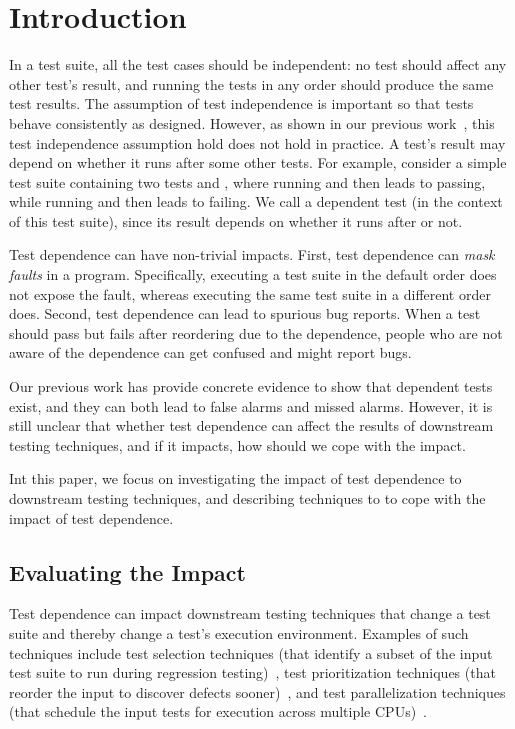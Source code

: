 \section{Introduction}


In a test suite, all the test cases should be independent:
no test should affect any other test's result, and running
the tests in any order should produce the same test results.
The assumption of test independence is important so that
tests behave consistently as designed. However,
as shown in our previous work~\cite{}, this test independence
assumption hold does not hold in practice.
A test's result may depend on whether it runs after
some other tests. For example, consider 
a simple test suite containing two tests  and ,
where running  and then 
leads to  passing, while running  and
then  leads to  failing. We call
 a dependent test (in the context of this test suite),
since its result depends on whether it runs after  or not.


Test dependence can have non-trivial impacts. First,
test dependence can \textit{mask faults} in a program.
Specifically, executing a test suite in the default order does not
expose the fault, whereas executing the same test suite in
a different order does. Second, 
test dependence can lead to spurious bug reports.
When a test should pass but fails after reordering due to
the dependence, people who are not aware of the dependence
can get confused and might report bugs. 



Our previous work has provide concrete evidence to
show that dependent tests exist, and they can both lead
to false alarms and missed alarms. However, it is still
unclear that whether test dependence can affect the
results of downstream testing techniques, and if it
impacts, how should we cope with the impact.

Int this paper, we focus on investigating the impact of
test dependence to downstream testing techniques, and
describing techniques to to cope with the impact of test dependence.

\subsection{Evaluating the Impact}

Test dependence can impact downstream testing
techniques that change a test suite and thereby change a test's
execution environment. Examples of such techniques include
test selection techniques (that identify a subset of the input
test suite to run during regression testing)~\cite{},
test prioritization techniques (that reorder the input to
discover defects sooner)~\cite{}, and test parallelization
techniques (that schedule the input tests for execution across
multiple CPUs)~\cite{}.

